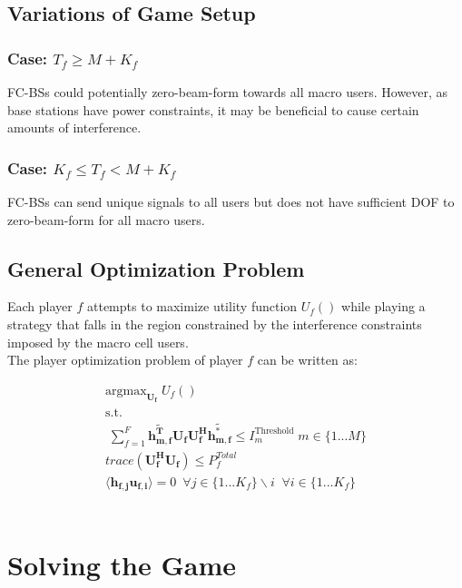 \documentclass[12pt]{article}
\begin{document}
\subsection{Variations of Game Setup}

\subsubsection{Case: $T_f \geq M + K_f$}
FC-BSs could potentially zero-beam-form towards all macro users. However, as base stations have power constraints, it may be beneficial to cause certain amounts of interference. 

\subsubsection{Case: $K_f \leq T_f < M + K_f$}
FC-BSs can send unique signals to all users but does not have sufficient DOF to zero-beam-form for all macro users.


\subsection{General Optimization Problem}

Each player $f$ attempts to maximize utility function $U_f()$ while playing a strategy that falls in the region constrained by the interference constraints imposed by the macro cell users.
\\

The player optimization problem of player $f$ can be written as:


\begin{gather} 
\mathrm{argmax}_{\mathbf{U_f}} \; U_f()\label{utility}
\\
\mathrm{s.t.}
\\
\; \sum^F_{f=1} \mathbf{\tilde{h_{m,f}^T}}  \mathbf{U_f}  \mathbf{U_f^H} \mathbf{\tilde{h_{m,f}^*}} \leq I^{\mathrm{Threshold}}_{m} \; m \in \{1 ... M\} \label{interference_contstraint}
\\
trace(\mathbf{U_f^H}\mathbf{U_f}) \leq P^{Total}_{f} \label{power_constraint}
\\
\langle \mathbf{h_{f,j}}\mathbf{u_{f,i}} \rangle =0\ \; \forall j \in \{1 ... K_f\}\backslash i \;\; \forall i \in \{1 ... K_f\} \label{Zero_Forcing}
\end{gather}
\\


\section{Solving the Game}
\end{document}
